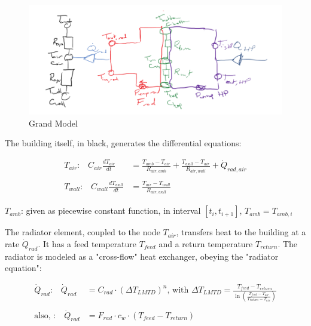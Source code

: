 \begin{figure}[H]
	\centering
	\includegraphics[width=0.9\columnwidth]{Pictures/grand_model}
	\caption[Short title]{Grand Model}
	\label{fig:grandmodel}
\end{figure} 

The building itself, in black, generates the differential equations:

\begin{equation}
	\begin{aligned}
		T_{air} \text{:} \quad C_{air}\frac{dT_{air}}{dt} &=\frac{T_{amb}-T_{air}}{R_{air, amb}} + \frac{T_{wall}-T_{air}}{R_{air, wall}} + \dot{Q}_{rad, air} 
		\\ \\
		T_{wall} \text{:} \quad C_{wall}\frac{dT_{wall}}{dt} &=\frac{T_{air}-T_{wall}}{R_{air, wall}}
	\end{aligned}
\end{equation}

$T_{amb}$: given as piecewise constant function, in interval $[t_i, t_{i+1}]$, $T_{amb} = T_{amb, i}$

The radiator element, coupled to the node $T_{air}$, transfers heat to the building at a rate $\dot{Q}_{rad}$. It has a feed temperature $T_{feed}$ and a return temperature $T_{return}$. The radiator is modeled as a "cross-flow" heat exchanger, obeying the "radiator equation":

{\color{blue}
\begin{equation}
	\begin{aligned}
		\dot{Q}_{rad} \text{:} \quad \dot{Q}_{rad} &= C_{rad} \cdot (\Delta T_{LMTD})^n \text{, with } \Delta T_{LMTD} = \frac{T_{feed} - T_{return}}{\ln\left(\frac{T_{feed} -T_{air}}{T_{return} - T_{air}}\right)}
		\\ \\
	    \text{also, :} \quad \dot{Q}_{rad} &= F_{rad} \cdot c_w \cdot (T_{feed} - T_{return})
	\end{aligned}
\end{equation}
}

